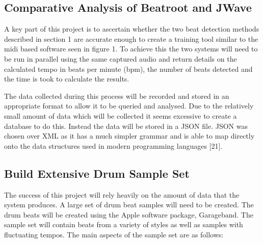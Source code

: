 \documentclass[a4paper, 11pt]{article}
\begin{document}
\subsection{Comparative Analysis of Beatroot and JWave}
A key part of this project is to ascertain whether the two beat detection methods described in section 1 are accurate enough to create a training tool similar to the midi based software seen in figure 1. To achieve this the two systems will need to be run in parallel using the same captured audio and return details on the calculated tempo in beats per minute (bpm), the number of beats detected and the time is took to calculate the results. 

The data collected during this process will be recorded and stored in an appropriate format to allow it to be queried and analysed. Due to the relatively small amount of data which will be collected it seems excessive to create a database to do this. Instead the data will be stored in a JSON file. JSON was chosen over XML as it has a much simpler grammar and is able to map directly onto the data structures used in modern programming languages [21].

\subsection{Build Extensive Drum Sample Set}
The success of this project will rely heavily on the amount of data that the system produces. A large set of drum beat samples will need to be created. The drum beats will be created using the Apple software package, Garageband. The sample set will contain beats from a variety of styles as well as samples with fluctuating tempos. The main aspects of the sample set are as follows:
\end{document}

